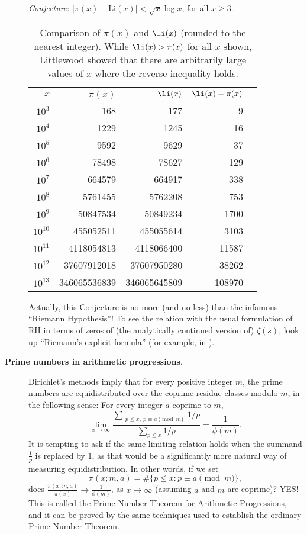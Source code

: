 \begin{description}
\textit{Conjecture}: $|\pi(x)-\mathrm{Li}(x)|  < \sqrt{x}\log{x}$, for all $x\ge 3$.\smallskip

\begin{table}[t]\caption{Comparison of $\pi(x)$ and
    $\li(x)$ (rounded to the nearest integer). While $\li(x) > \pi(x)$ for all $x$ shown, Littlewood showed that there are arbitrarily large values of $x$ where the reverse inequality holds.}\def\arraystretch{1.11}\label{tbl:tbl1}\begin{center}
    \begin{tabular}{|r||r|r|r|r}\hline
    $x$ & $\pi(x)$ & $\li(x)$ & $\li(x)-\pi(x)$ \\ \hline\hline
    $10^3$ & 168 & 177 & 9  \\
    $10^4$ & 1229 & 1245 & 16  \\
    $10^5$ & \num{9592} & \num{9629} & 37 \\
    $10^6$ & \num{78498} & \num{78627} & 129 \\
    $10^7$ & \num{664579} & \num{664917} & 338 \\
    $10^8$ & \num{5761455} & \num{5762208} & 753 \\
    $10^9$ & \num{50847534} & \num{50849234} & \num{1700} \\
    $10^{10}$ & \num{455052511} & \num{455055614} & \num{3103}  \\
    $10^{11}$ & \num{4118054813} & \num{4118066400} & \num{11587}\\
    $10^{12}$ & \num{37607912018} & \num{37607950280} & \num{38262}  \\
    $10^{13}$ & \num{346065536839} & \num{346065645809} & \num{108970}  \\
    \hline
    \end{tabular}\end{center}
    \end{table}
Actually, this Conjecture is no more (and no less) than the infamous ``\textsf{Riemann Hypothesis}''! To see the relation with the usual formulation of RH in terms of zeros of (the analytically continued version of) $\zeta(s)$, look up ``\textsf{Riemann's explicit formula}'' (for example, in \cite{davenport}).\bigskip

\item[\textbf{Prime numbers in arithmetic progressions}.] Dirichlet's methods imply that for every positive integer $m$, the prime numbers are equidistributed over the coprime residue classes modulo $m$, in the following sense: For every integer $a$ coprime to $m$,
$$  \lim_{x\to\infty} \frac{\sum_{\substack{p \le x,~p\equiv a\!\!\!\!\!\pmod{m}}} 1/p}{\sum_{p\le x} 1/p}= \frac{1}{\phi(m)}. $$
It is tempting to ask if the same limiting relation holds when the summand $\frac{1}{p}$ is replaced by $1$, as that would be a significantly more natural way of measuring equidistribution. In other words, if we set $$\pi(x;m,a) = \#\{p\le x: p\equiv a\!\!\!\!\pmod{m}\},$$ does $\frac{\pi(x;m,a)}{\pi(x)} \to \frac{1}{\phi(m)}$, as $x\to\infty$ (assuming $a$ and $m$ are coprime)?  YES! This is called the Prime Number Theorem for Arithmetic Progressions, and it can be proved by the same techniques used to establish the ordinary Prime Number Theorem.\smallskip


\end{description}
